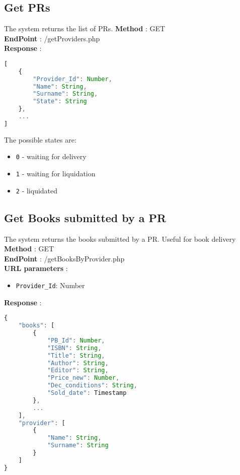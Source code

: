\subsection{Get PRs}
The system returns the list of PRs.
\textbf{Method} : GET \\
\textbf{EndPoint} : /getProviders.php \\
\textbf{Response} :
\begin{lstlisting}[language=JavaScript, label={lst:jscode}, basicstyle=\ttfamily]
[
    {
        "Provider_Id": Number,
        "Name": String,
        "Surname": String,
        "State": String
    },
    ...
]
\end{lstlisting}
The possible states are:
\begin{itemize}
    \item \texttt{0} - waiting for delivery
    \item \texttt{1} - waiting for liquidation
    \item \texttt{2} - liquidated
\end{itemize}

\subsection{Get Books submitted by a PR}
The system returns the books submitted by a PR. Useful for book delivery\\
\textbf{Method} : GET \\
\textbf{EndPoint} : /getBooksByProvider.php \\
\textbf{URL parameters} :
\begin{itemize}
    \item \texttt{Provider\_Id}: Number
\end{itemize}
\textbf{Response} :
\begin{lstlisting}[language=JavaScript, label={lst:jscode}, basicstyle=\ttfamily]
{
    "books": [
        {
            "PB_Id": Number,
            "ISBN": String,
            "Title": String,
            "Author": String,
            "Editor": String,
            "Price_new": Number,
            "Dec_conditions": String,
            "Sold_date": Timestamp
        },
        ...
    ],
    "provider": [
        {
            "Name": String,
            "Surname": String
        }
    ]
}
\end{lstlisting}

